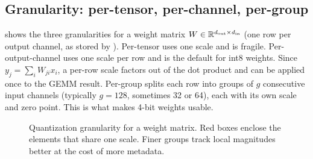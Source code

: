 \subsection{Granularity: per-tensor, per-channel, per-group}
 shows the three granularities for a weight matrix
$W\in\mathbb{R}^{d_{\text{out}}\times d_{\text{in}}}$ (one row per output channel, as stored by
). Per-tensor uses one scale and is fragile. Per-output-channel uses one
scale per row and is the default for int8 weights. Since $y_j=\sum_i W_{ji}x_i$, a
per-row scale factors out of the dot product and can be applied once to the GEMM
result. Per-group splits each row into groups of $g$ consecutive input channels
(typically $g=128$, sometimes 32 or 64), each with its own scale and zero point. This is
what makes 4-bit weights usable.

\begin{figure}[t]
\centering
{}
\caption{Quantization granularity for a weight matrix. Red boxes enclose the elements
that share one scale. Finer groups track local magnitudes better at the cost of more
metadata.}
\label{fig:efficient:granularity}
\end{figure}

